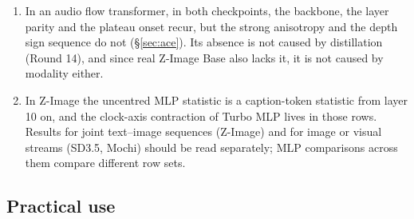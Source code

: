 \documentclass[11pt]{article}
\begin{document}
\begin{enumerate}
 \item In an audio flow transformer, in both checkpoints, the backbone, the layer parity and the plateau onset recur, but the strong anisotropy and the depth sign sequence do not (\S\ref{sec:ace}). Its absence is not caused by distillation (Round 14), and since real Z-Image Base also lacks it, it is not caused by modality either.
 \item In Z-Image the uncentred MLP statistic is a caption-token statistic from layer 10 on, and the clock-axis contraction of Turbo MLP lives in those rows. Results for joint text--image sequences (Z-Image) and for image or visual streams (SD3.5, Mochi) should be read separately; MLP comparisons across them compare different row sets.
\end{enumerate}

\subsection{Practical use}\label{sec:practice}
\end{document}
